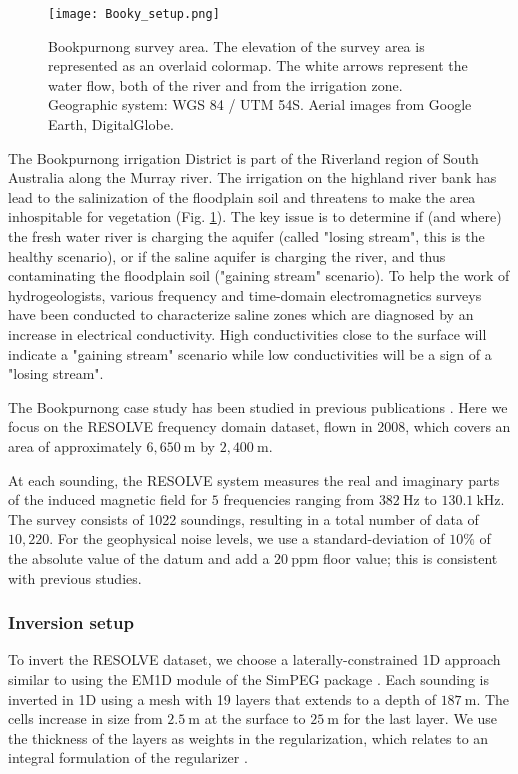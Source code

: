\documentclass[extra]{gji} %
\begin{document}
\begin{figure}
    \centering
    \texttt{[image: Booky\_setup.png]}
    \caption[]{Bookpurnong survey area. The elevation of the survey area is represented as an overlaid colormap. The white arrows represent the water flow, both of the river and from the irrigation zone. Geographic system: WGS 84 / UTM 54S. Aerial images from Google Earth,  DigitalGlobe.}
    \label{fig:Book_Setup}
\end{figure}

The Bookpurnong irrigation District is part of the Riverland region of South Australia along the Murray river. The irrigation on the highland river bank has lead to the salinization of the floodplain soil and threatens to make the area inhospitable for vegetation (Fig. \ref{fig:Book_Setup}). The key issue is to determine if (and where) the fresh water river is charging the aquifer (called "losing stream", this is the healthy scenario), or if the saline aquifer is charging the river, and thus contaminating the floodplain soil ("gaining stream" scenario). To help the work of hydrogeologists, various frequency and time-domain electromagnetics surveys have been conducted to characterize saline zones which are diagnosed by an increase in electrical conductivity. High conductivities close to the surface will indicate a "gaining stream" scenario while low conductivities will be a sign of a "losing stream".

The Bookpurnong case study has been studied in previous publications \citep{Bookpurnong,viezzoli2010,Yang2017}. Here we focus on the RESOLVE frequency domain dataset, flown in 2008, which covers an area of approximately $6,650~\text{m}$ by $2,400~\text{m}$.

At each sounding, the RESOLVE system measures the real and imaginary parts of the induced magnetic field for $5$ frequencies ranging from $382~\text{Hz}$ to $130.1~\text{kHz}$. The survey consists of 1022 soundings, resulting in a total number of data of $10,220$. For the geophysical noise levels, we use a standard-deviation of $10\%$ of the absolute value of the datum and add a $20~\text{ppm}$ floor value; this is consistent with previous studies.

\subsubsection{Inversion setup}

To invert the RESOLVE dataset, we choose a laterally-constrained 1D approach similar to \cite{Viezzoli2008} using the EM1D module of the SimPEG package \citep{heagy2017framework,SimPEGEM1DPoster}. Each sounding is inverted in 1D using a mesh with 19 layers that extends to a depth of $187~\text{m}$. The cells increase in size from $2.5~\text{m}$ at the surface to $25~\text{m}$ for the last layer. We use the thickness of the layers as weights in the regularization, which relates to an integral formulation of the regularizer \citep{doi:10.1190/1.9781560801719.ch5}.
\end{document}
